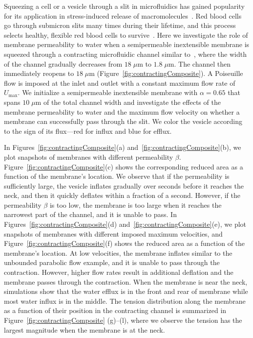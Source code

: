 \documentclass[prb,preprint,showpacs,preprintnumbers,amsmath,amssymb,longbibliography]{revtex4-1}
\begin{document}
Squeezing a cell or a vesicle through a slit in microfluidics
has gained popularity for its application in stress-induced release of
macromolecules~\cite{ShareiEtAl2013_PNAS, Pak2015_PNAS,
ZhangShenHoganBarakatMisbah2018_BJ, LuoBai2019_PoF}. Red blood cells go
through submicron slits many times during their lifetime, and this
process selects healthy, flexible red blood cells to
survive~\cite{wu2015critical,LuPeng2019_PoF}. Here we investigate the
role of membrane permeability to water when a semipermeable inextensible membrane is
squeezed through a contracting microfluidic channel similar
to~\citet{wu2015critical}, where the width of the channel gradually
decreases from $18 \;\mu$m to $1.8\; \mu$m. The channel then immediately
reopens to $18\;\mu$m (Figure~\ref{fig:contractingComposite}). A
Poiseuille flow is imposed at the inlet and outlet with a constant
maximum flow rate of $U_{\max}$. We initialize a semipermeable inextensible membrane
with $\alpha = 0.65$ that spans $10\; \mu$m of the total channel width
and investigate the effects of the membrane permeability to water and
the maximum flow velocity on whether a membrane can successfully pass
through the slit. We color the vesicle according to the sign of its
flux---red for influx and blue for efflux.

In Figures~\ref{fig:contractingComposite}(a)
and~\ref{fig:contractingComposite}(b), we plot snapshots of membranes
with different permeability $\beta$.
Figure~\ref{fig:contractingComposite}(c) shows the corresponding reduced
area as a function of the membrane's location. We observe that if the
permeability is sufficiently large, the vesicle inflates gradually over
seconds before it reaches the neck, and then it quickly deflates within
a fraction of a second. However, if the permeability $\beta$ is too
low, the membrane is too large when it reaches the narrowest part of the
channel, and it is unable to pass. In
Figures~\ref{fig:contractingComposite}(d)
and~\ref{fig:contractingComposite}(e), we plot snapshots of membranes
with different imposed maximum velocities, and
Figure~\ref{fig:contractingComposite}(f) shows the reduced area as a
function of the membrane's location. At low velocities, the membrane
inflates similar to the unbounded parabolic flow example, and it is
unable to pass through the contraction. However, higher flow rates
result in additional deflation and the membrane passes through the
contraction. When the membrane is near the neck, simulations show that
the water efflux is in the front and rear of membrane while most water
influx is in the middle. The tension distribution along the membrane as
a function of their position in the contracting channel is summarized in
Figure~\ref{fig:contractingComposite} (g)--(l), where we observe the
tension has the largest magnitude when the membrane is at the neck. 
\end{document}
